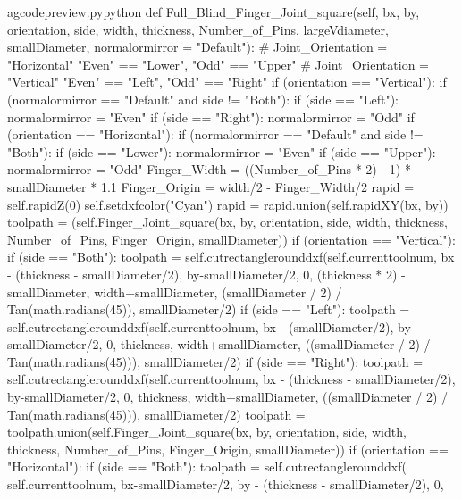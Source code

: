 \documentclass{ltxdoc}
\begin{document}
\lstset{firstnumber=\thegcpy}
\begin{writecode}{a}{gcodepreview.py}{python}
    def Full_Blind_Finger_Joint_square(self, bx, by, orientation, side, width, thickness, Number_of_Pins, largeVdiameter, smallDiameter, normalormirror = "Default"):
    # Joint_Orientation = "Horizontal" "Even" == "Lower", "Odd" == "Upper"
    # Joint_Orientation = "Vertical" "Even" == "Left", "Odd" == "Right"
        if (orientation == "Vertical"):
            if (normalormirror == "Default" and side != "Both"):
                if (side == "Left"):
                     normalormirror = "Even"
                if (side == "Right"):
                     normalormirror = "Odd"
        if (orientation == "Horizontal"):
            if (normalormirror == "Default" and side != "Both"):
                if (side == "Lower"):
                     normalormirror = "Even"
                if (side == "Upper"):
                     normalormirror = "Odd"
        Finger_Width = ((Number_of_Pins * 2) - 1) * smallDiameter * 1.1
        Finger_Origin = width/2 - Finger_Width/2
        rapid = self.rapidZ(0)
        self.setdxfcolor("Cyan")
        rapid = rapid.union(self.rapidXY(bx, by))
        toolpath = (self.Finger_Joint_square(bx, by, orientation, side, width, thickness, Number_of_Pins, Finger_Origin, smallDiameter))
        if (orientation == "Vertical"):
            if (side == "Both"):
                toolpath = self.cutrectanglerounddxf(self.currenttoolnum, bx - (thickness - smallDiameter/2), by-smallDiameter/2, 0, (thickness * 2) - smallDiameter, width+smallDiameter, (smallDiameter / 2) / Tan(math.radians(45)), smallDiameter/2)
            if (side == "Left"):
                toolpath = self.cutrectanglerounddxf(self.currenttoolnum, bx - (smallDiameter/2), by-smallDiameter/2, 0, thickness, width+smallDiameter, ((smallDiameter / 2) / Tan(math.radians(45))), smallDiameter/2)
            if (side == "Right"):
                toolpath = self.cutrectanglerounddxf(self.currenttoolnum, bx - (thickness - smallDiameter/2), by-smallDiameter/2, 0, thickness, width+smallDiameter, ((smallDiameter / 2) / Tan(math.radians(45))), smallDiameter/2)
        toolpath = toolpath.union(self.Finger_Joint_square(bx, by, orientation, side, width, thickness, Number_of_Pins, Finger_Origin, smallDiameter))
        if (orientation == "Horizontal"):
            if (side == "Both"):
                toolpath = self.cutrectanglerounddxf(
                    self.currenttoolnum, 
                    bx-smallDiameter/2, 
                    by - (thickness - smallDiameter/2), 
                    0, 

\end{writecode}
\end{document}
